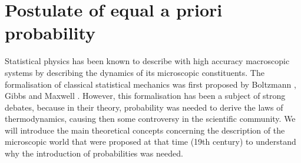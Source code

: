 \section{Postulate of equal a priori probability}
Statistical physics has been known to describe with high accuracy macroscopic systems by describing the dynamics of its microscopic constituents. The formalisation of classical statistical mechanics was first proposed by Boltzmann \cite{boltzmann1877beziehung, boltzmann1866mechanische}, Gibbs \cite{gibbs_elementary_1902} and Maxwell \cite{maxwell1879boltzmann}. However, this formalisation has been a subject of strong debates, because in their theory, probability was needed to derive the laws of thermodynamics, causing then some controversy \cite{uffink_handbook_2007} in the scientific community. We will introduce the main theoretical concepts concerning the description of the microscopic world that were proposed at that time (19th century) to understand why the introduction of probabilities was needed.\\
